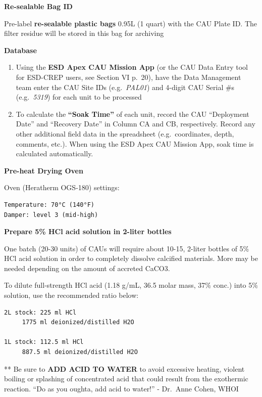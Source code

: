 \documentclass[]{book}
\begin{document}
\textbf{Re-sealable Bag ID}

Pre-label \textbf{re-sealable plastic bags} 0.95L (1 quart) with the CAU Plate ID. The filter residue will be stored in this bag for archiving

\textbf{Database}

\begin{enumerate}
\def\labelenumi{\arabic{enumi}.}
\item
  Using the \textbf{ESD Apex CAU Mission App} (or the CAU Data Entry tool for ESD-CREP users, see Section VI p.~20), have the Data Management team enter the CAU Site IDs (e.g.~\emph{PAL01}) and 4-digit CAU Serial \#s (e.g.~\emph{5319}) for each unit to be processed
\item
  To calculate the \textbf{``Soak Time''} of each unit, record the CAU ``Deployment Date'' and ``Recovery Date'' in Column CA and CB, respectively. Record any other additional field data in the spreadsheet (e.g.~coordinates, depth, comments, etc.). When using the ESD Apex CAU Mission App, soak time is calculated automatically.
\end{enumerate}

\textbf{Pre-heat Drying Oven}

Oven (Heratherm OGS-180) settings:

\begin{verbatim}
Temperature: 70°C (140°F)  
Damper: level 3 (mid-high)  
\end{verbatim}

\textbf{Prepare 5\% HCl acid solution in 2-liter bottles}

One batch (20-30 units) of CAUs will require about 10-15, 2-liter bottles of 5\% HCl acid solution in order to completely dissolve calcified materials. More may be needed depending on the amount of accreted CaCO3.

To dilute full-strength HCl acid (1.18 g/mL, 36.5 molar mass, 37\% conc.) into 5\% solution, use the recommended ratio below:

\begin{verbatim}
2L stock: 225 ml HCl  
     1775 ml deionized/distilled H2O  

1L stock: 112.5 ml HCl  
     887.5 ml deionized/distilled H2O  
\end{verbatim}

** Be sure to \textbf{ADD ACID TO WATER} to avoid excessive heating, violent boiling or splashing of concentrated acid that could result from the exothermic reaction.
``Do as you oughta, add acid to water!'' - Dr.~Anne Cohen, WHOI
\end{document}
